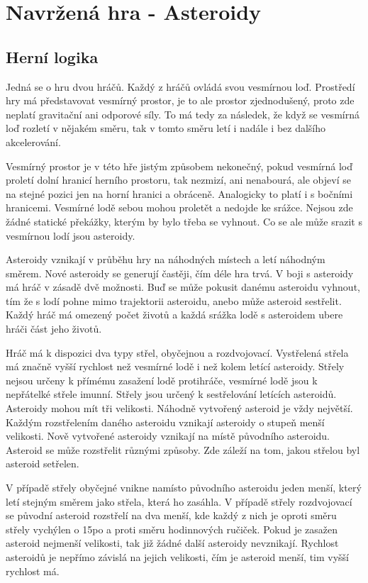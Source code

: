 \chapter{Navržená hra - Asteroidy}

\section{Herní logika}
Jedná se o hru dvou hráčů. 
Každý z hráčů ovládá svou vesmírnou loď.
Prostředí hry má představovat vesmírný prostor, je to ale prostor zjednodušený, proto zde neplatí gravitační ani odporové síly.
To má tedy za následek, že když se vesmírná loď rozletí v nějakém směru, tak v tomto směru letí i nadále i bez dalšího akcelerování.
\par
Vesmírný prostor je v této hře jistým způsobem nekonečný, pokud vesmírná loď proletí dolní hranicí herního prostoru, tak nezmizí, ani nenabourá, ale objeví se na stejné pozici jen na horní hranici a obráceně. Analogicky to platí i s bočními hranicemi.
Vesmírné lodě sebou mohou proletět a nedojde ke srážce.
Nejsou zde žádné statické překážky, kterým by bylo třeba se vyhnout. Co se ale může srazit s vesmírnou lodí jsou asteroidy.    
\par
Asteroidy vznikají v průběhu hry na náhodných místech a letí náhodným směrem. Nové asteroidy se generují častěji, čím déle hra trvá.
V boji s asteroidy má hráč v zásadě dvě možnosti. Buď se může pokusit danému asteroidu vyhnout, tím že s lodí pohne mimo trajektorii asteroidu, anebo může asteroid sestřelit.
Každý hráč má omezený počet životů a každá srážka lodě s asteroidem ubere hráči část jeho životů.
\par
Hráč má k dispozici dva typy střel, obyčejnou a rozdvojovací. Vystřelená střela má značně vyšší rychlost než vesmírné lodě i než kolem letící asteroidy.
Střely nejsou určeny k přímému zasažení lodě protihráče, vesmírné lodě jsou k nepřátelké střele imunní.
Střely jsou určený k sestřelování letících asteroidů. Asteroidy mohou mít tři velikosti. Náhodně vytvořený asteroid je vždy největší. Každým rozstřelením daného asteroidu vznikají asteroidy o stupeň menší velikosti.
Nově vytvořené asteroidy vznikají na místě původního asteroidu. Asteroid se může rozstřelit různými způsoby. Zde záleží na tom, jakou střelou byl asteroid setřelen. 
\par
V případě střely obyčejné vnikne namísto původního asteroidu jeden menší, který letí stejným směrem jako střela, která ho zasáhla.
V případě střely rozdvojovací se původní asteroid rozstřelí na dva menší, kde každý z nich je oproti směru střely vychýlen o 15\textdegree po a proti směru hodinnových ručiček.
Pokud je zasažen asteroid nejmenší velikosti, tak již žádné další asteroidy nevznikají. 
Rychlost asteroidů je nepřímo závislá na jejich velikosti, čím je asteroid menší, tim vyšší rychlost má.
\par



